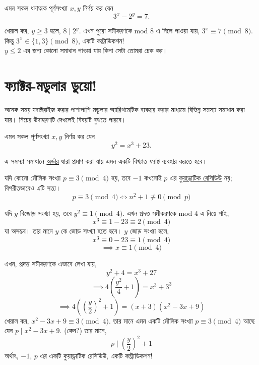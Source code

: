 \documentclass[11pt]{report}
\begin{document}
\begin{tcolorbox}[colframe=black!80!green,title=উদাহরণ 2.3.1]
এমন সকল ধনাত্মক পূর্ণসংখ্যা $x, y$ নির্ণয় কর যেন $$3^x-2^y=7.$$
\end{tcolorbox}

খেয়াল কর, $y \geq 3$ হলে, $8 \mid 2^y$. এখন পুরো সমীকরণকে mod $8$ এ নিলে পাওয়া যায়, $3^x \equiv 7 \pmod{8}$. কিন্তু $3^x \in \{1,3\} \pmod{8}$, একটি কন্ট্রাডিকশন!\\

$y \leq 2$ এর জন্য কোনো সমাধান পাওয়া যায় কিনা সেটা তোমরা চেক কর।\\

\section{ফ্যাক্টর-মডুলার ডুয়ো!}

অনেক সময় ফ্যাক্টরাইজ করার পাশাপাশি মডুলার অ্যারিথমেটিক ব্যবহার করার মাধ্যমে বিভিন্ন সমস্যা সমাধান করা যায়। নিচের উদাহরণটি দেখলেই বিষয়টি বুঝতে পারবে।\\

\begin{tcolorbox}[colframe=black!80!green,title=উদাহরণ 2.4.1]
এমন সকল পূর্ণসংখ্যা $x, y$ নির্ণয় কর যেন $$y^2=x^3+23.$$
\end{tcolorbox}

এ সমস্যা সমাধানে \href{https://web.evanchen.cc/handouts/ORPR/ORPR.pdf}{অর্ডার} দ্বারা প্রমাণ করা যায় এমন একটি বিখ্যাত ফ্যাক্ট ব্যবহার করতে হবে।\\

\begin{tcolorbox}[colframe=blue!80!blue]

যদি কোনো মৌলিক সংখ্যা $p \equiv 3 \pmod{4}$ হয়, তবে $-1$ কখনোই $p$ এর \href{https://en.wikipedia.org/wiki/Quadratic_residue}{কুয়াড্রাটিক রেসিডিউ} নয়; বিপরীতভাবেও এটি সত্য। $$p \equiv 3 \pmod{4} \iff n^2+1 \not \equiv 0 \pmod{p}$$

\end{tcolorbox}

যদি $y$ বিজোড় সংখ্যা হয়, তবে $y^2 \equiv 1 \pmod{4}.$ এখন প্রদত্ত সমীকরণকে mod $4$ এ নিয়ে পাই, $$x^3 \equiv 1-23 \equiv 2 \pmod{4}$$ 
যা অসম্ভব। তার মানে $y$ কে জোড় সংখ্যা হতে হবে। $y$ জোড় সংখ্যা হলে, $$x^3 \equiv 0-23 \equiv 1 \pmod{4}$$ $$\implies x \equiv 1 \pmod{4}$$

এখন, প্রদত্ত সমীকরণকে এভাবে লেখা যায়, $$y^2+4 = x^3+27$$ $$\implies 4(\frac{y^2}{4}+1)  = x^3+3^3$$ $$\implies 4((\frac{y}{2})^2+1) = (x+3)(x^2-3x+9)$$ খেয়াল কর, $x^2-3x+9 \equiv 3 \pmod{4}$. তার মানে এমন একটি মৌলিক সংখ্যা $p \equiv 3 \pmod{4}$ আছে যেন $p \mid x^2-3x+9$. (কেন?) তার মানে, $$p \mid (\frac{y}{2})^2+1$$ অর্থাৎ, $-1$, $p$ এর একটি কুয়াড্রাটিক রেসিডিউ, একটি কন্ট্রাডিকশন!
\end{document}
